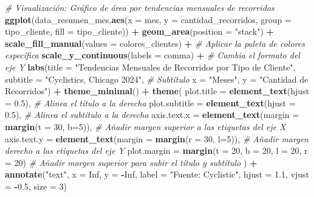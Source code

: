 \documentclass[
]{article}
\newenvironment{Shaded}{\begin{snugshade}}{\end{snugshade}}
\newcommand{\AttributeTok}[1]{\textcolor[rgb]{0.13,0.29,0.53}{#1}}
\newcommand{\CommentTok}[1]{\textcolor[rgb]{0.56,0.35,0.01}{\textit{#1}}}
\newcommand{\ConstantTok}[1]{\textcolor[rgb]{0.56,0.35,0.01}{#1}}
\newcommand{\DecValTok}[1]{\textcolor[rgb]{0.00,0.00,0.81}{#1}}
\newcommand{\FloatTok}[1]{\textcolor[rgb]{0.00,0.00,0.81}{#1}}
\newcommand{\FunctionTok}[1]{\textcolor[rgb]{0.13,0.29,0.53}{\textbf{#1}}}
\newcommand{\NormalTok}[1]{#1}
\newcommand{\SpecialCharTok}[1]{\textcolor[rgb]{0.81,0.36,0.00}{\textbf{#1}}}
\newcommand{\StringTok}[1]{\textcolor[rgb]{0.31,0.60,0.02}{#1}}
\begin{document}
\begin{Shaded}
\begin{Highlighting}[]
\CommentTok{\# Visualización: Gráfico de área por tendencias mensuales de recorridos}
\FunctionTok{ggplot}\NormalTok{(data\_resumen\_mes,}\FunctionTok{aes}\NormalTok{(}\AttributeTok{x =}\NormalTok{ mes, }\AttributeTok{y =}\NormalTok{ cantidad\_recorridos, }\AttributeTok{group =}\NormalTok{ tipo\_cliente, }\AttributeTok{fill =}\NormalTok{ tipo\_cliente)) }\SpecialCharTok{+}
  \FunctionTok{geom\_area}\NormalTok{(}\AttributeTok{position =} \StringTok{"stack"}\NormalTok{) }\SpecialCharTok{+}
  \FunctionTok{scale\_fill\_manual}\NormalTok{(}\AttributeTok{values =}\NormalTok{ colores\_clientes) }\SpecialCharTok{+} \CommentTok{\# Aplicar la paleta de colores específica}
  \FunctionTok{scale\_y\_continuous}\NormalTok{(}\AttributeTok{labels =}\NormalTok{ comma) }\SpecialCharTok{+} \CommentTok{\# Cambia el formato del eje Y}
  \FunctionTok{labs}\NormalTok{(}\AttributeTok{title =} \StringTok{"Tendencias Mensuales de Recorridos por Tipo de Cliente"}\NormalTok{,}
       \AttributeTok{subtitle =} \StringTok{"Cyclistics, Chicago 2024"}\NormalTok{, }\CommentTok{\# Subtítulo}
       \AttributeTok{x =} \StringTok{"Meses"}\NormalTok{,}
       \AttributeTok{y =} \StringTok{"Cantidad de Recorridos"}\NormalTok{) }\SpecialCharTok{+}
  \FunctionTok{theme\_minimal}\NormalTok{() }\SpecialCharTok{+}
  \FunctionTok{theme}\NormalTok{(}
    \AttributeTok{plot.title =} \FunctionTok{element\_text}\NormalTok{(}\AttributeTok{hjust =} \FloatTok{0.5}\NormalTok{),  }\CommentTok{\# Alinea el título a la derecha}
    \AttributeTok{plot.subtitle =} \FunctionTok{element\_text}\NormalTok{(}\AttributeTok{hjust =} \FloatTok{0.5}\NormalTok{), }\CommentTok{\# Alinea el subtítulo a la derecha}
    \AttributeTok{axis.text.x =} \FunctionTok{element\_text}\NormalTok{(}\AttributeTok{margin =} \FunctionTok{margin}\NormalTok{(}\AttributeTok{t =} \DecValTok{30}\NormalTok{, }\AttributeTok{b=}\DecValTok{5}\NormalTok{)), }\CommentTok{\# Añadir margen superior a las etiquetas del eje X }
    \AttributeTok{axis.text.y =} \FunctionTok{element\_text}\NormalTok{(}\AttributeTok{margin =} \FunctionTok{margin}\NormalTok{(}\AttributeTok{r =} \DecValTok{30}\NormalTok{, }\AttributeTok{l=}\DecValTok{5}\NormalTok{)), }\CommentTok{\# Añadir margen derecho a las etiquetas del eje Y}
    \AttributeTok{plot.margin =} \FunctionTok{margin}\NormalTok{(}\AttributeTok{t =} \DecValTok{20}\NormalTok{, }\AttributeTok{b =} \DecValTok{20}\NormalTok{, }\AttributeTok{l =} \DecValTok{20}\NormalTok{, }\AttributeTok{r =} \DecValTok{20}\NormalTok{) }\CommentTok{\# Añadir margen superior para subir el título y subtítulo}
\NormalTok{  ) }\SpecialCharTok{+}
  \FunctionTok{annotate}\NormalTok{(}\StringTok{"text"}\NormalTok{, }\AttributeTok{x =} \ConstantTok{Inf}\NormalTok{, }\AttributeTok{y =} \SpecialCharTok{{-}}\ConstantTok{Inf}\NormalTok{, }\AttributeTok{label =} \StringTok{"Fuente: Cyclistic"}\NormalTok{, }\AttributeTok{hjust =} \FloatTok{1.1}\NormalTok{, }\AttributeTok{vjust =} \SpecialCharTok{{-}}\FloatTok{0.5}\NormalTok{, }\AttributeTok{size =} \DecValTok{3}\NormalTok{)}
\end{Highlighting}
\end{Shaded}
\end{document}
